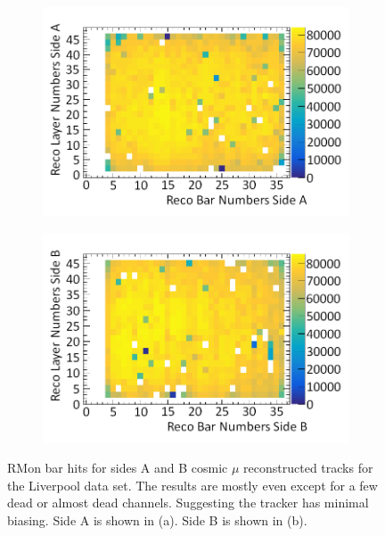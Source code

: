 \begin{figure}[!h]
\centering
\begin{subfigure}{.5\textwidth}
  \centering
  \includegraphics[width=\linewidth]{Chapter6/Figs/Raster/liverpoolSideAHitsMedText.png}
  \captionsetup{width=.9\linewidth}
  \caption{}
  \label{subFig:liverpoolSideAHits}
\end{subfigure}%
\begin{subfigure}{.5\textwidth}
  \centering
\includegraphics[width=\linewidth]{Chapter6/Figs/Raster/liverpoolSideBHitsMedText.png}
  \captionsetup{width=.9\linewidth}
  \caption{}
  \label{subFig:liverpoolSideBHits}
\end{subfigure}
\caption{RMon bar hits for sides A and B cosmic $\mu$ reconstructed tracks for the Liverpool data set. The results are mostly even except for a few dead or almost dead channels. Suggesting the tracker has minimal biasing. Side A is shown in (a). Side B is shown in (b).}
\label{fig:liverpoolSideABHits}
\end{figure}

